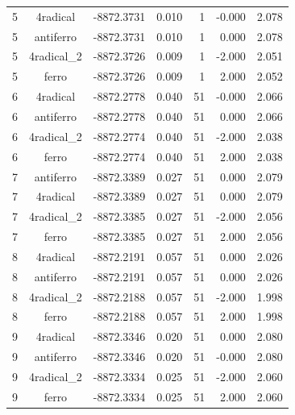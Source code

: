 \begin{longtable}{@{}ccrrrrr@{}}
\rowcolor{gray!20} 5 & 4radical & -8872.3731 & 0.010 & 1 & -0.000 & 2.078 \\
5 & antiferro & -8872.3731 & 0.010 & 1 & 0.000 & 2.078 \\
5 & 4radical\_2 & -8872.3726 & 0.009 & 1 & -2.000 & 2.051 \\
5 & ferro & -8872.3726 & 0.009 & 1 & 2.000 & 2.052 \\
\rowcolor{gray!20} 6 & 4radical & -8872.2778 & 0.040 & 51 & -0.000 & 2.066 \\
6 & antiferro & -8872.2778 & 0.040 & 51 & 0.000 & 2.066 \\
6 & 4radical\_2 & -8872.2774 & 0.040 & 51 & -2.000 & 2.038 \\
6 & ferro & -8872.2774 & 0.040 & 51 & 2.000 & 2.038 \\
\rowcolor{gray!20} 7 & antiferro & -8872.3389 & 0.027 & 51 & 0.000 & 2.079 \\
7 & 4radical & -8872.3389 & 0.027 & 51 & 0.000 & 2.079 \\
7 & 4radical\_2 & -8872.3385 & 0.027 & 51 & -2.000 & 2.056 \\
7 & ferro & -8872.3385 & 0.027 & 51 & 2.000 & 2.056 \\
\rowcolor{gray!20} 8 & 4radical & -8872.2191 & 0.057 & 51 & 0.000 & 2.026 \\
8 & antiferro & -8872.2191 & 0.057 & 51 & 0.000 & 2.026 \\
8 & 4radical\_2 & -8872.2188 & 0.057 & 51 & -2.000 & 1.998 \\
8 & ferro & -8872.2188 & 0.057 & 51 & 2.000 & 1.998 \\
\rowcolor{gray!20} 9 & 4radical & -8872.3346 & 0.020 & 51 & 0.000 & 2.080 \\
9 & antiferro & -8872.3346 & 0.020 & 51 & -0.000 & 2.080 \\
9 & 4radical\_2 & -8872.3334 & 0.025 & 51 & -2.000 & 2.060 \\
9 & ferro & -8872.3334 & 0.025 & 51 & 2.000 & 2.060 \\
\end{longtable}